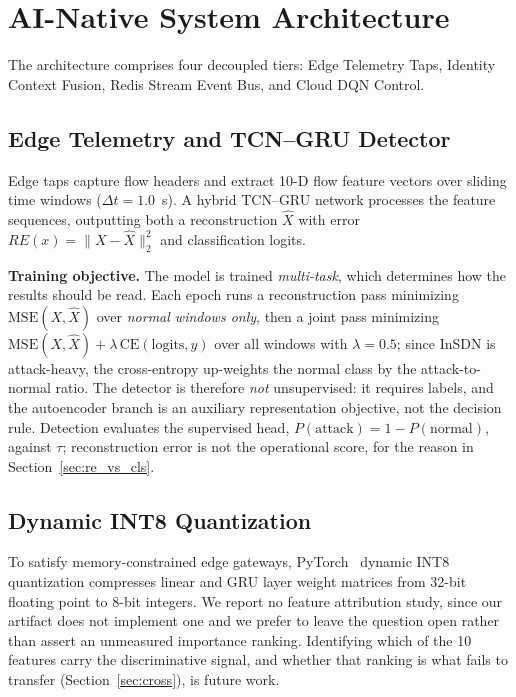 \documentclass[conference,a4paper]{IEEEtran}
\begin{document}
\section{AI-Native System Architecture}
\label{sec:arch}
The architecture comprises four decoupled tiers: Edge Telemetry Taps, Identity Context Fusion, Redis Stream Event Bus, and Cloud DQN Control.

\subsection{Edge Telemetry and TCN--GRU Detector}
Edge taps capture flow headers and extract 10-D flow feature vectors over sliding time windows ($\Delta t = 1.0$~s). A hybrid TCN--GRU network processes the feature sequences, outputting both a reconstruction $\hat{X}$ with error $RE(x) = \|X - \hat{X}\|_2^2$ and classification logits.

\textbf{Training objective.} The model is trained \emph{multi-task}, which determines how the results should be read. Each epoch runs a reconstruction pass minimizing $\mathrm{MSE}(X,\hat{X})$ over \emph{normal windows only}, then a joint pass minimizing $\mathrm{MSE}(X,\hat{X}) + \lambda\,\mathrm{CE}(\text{logits}, y)$ over all windows with $\lambda = 0.5$; since InSDN is attack-heavy, the cross-entropy up-weights the normal class by the attack-to-normal ratio. The detector is therefore \emph{not} unsupervised: it requires labels, and the autoencoder branch is an auxiliary representation objective, not the decision rule. Detection evaluates the supervised head, $P(\text{attack}) = 1 - P(\text{normal})$, against $\tau$; reconstruction error is not the operational score, for the reason in Section~\ref{sec:re_vs_cls}.

\subsection{Dynamic INT8 Quantization}
To satisfy memory-constrained edge gateways, PyTorch~\cite{b12} dynamic INT8 quantization compresses linear and GRU layer weight matrices from 32-bit floating point to 8-bit integers. We report no feature attribution study, since our artifact does not implement one and we prefer to leave the question open rather than assert an unmeasured importance ranking. Identifying which of the 10 features carry the discriminative signal, and whether that ranking is what fails to transfer (Section~\ref{sec:cross}), is future work.
\end{document}
